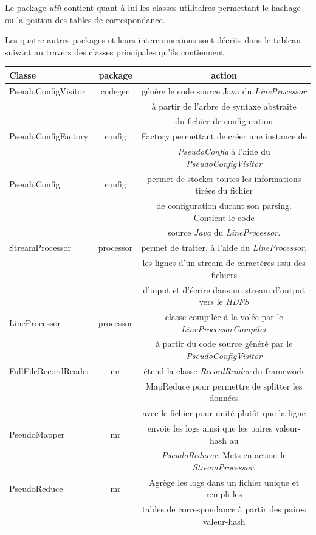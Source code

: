 \documentclass[12pt]{report}
\begin{document}
	Le package \textit{util} contient quant à lui les classes utilitaires permettant le hashage ou la gestion des tables de correspondance.
	
	Les quatre autres packages et leurs interconnexions sont décrits dans le tableau suivant au travers des classes principales qu'ils contiennent :\newline
	
	\begin{tabular}{|l|c|c|}
		\hline
		Classe & package & action \\
		\hline
		PseudoConfigVisitor & codegen & génère le code source Java du \textit{LineProcessor}\\
		&& à partir de l'arbre de syntaxe abstraite\\
		&&du fichier de configuration\\
		\hline
		PseudoConfigFactory&config&Factory permettant de créer une instance de \\
		&&\textit{PseudoConfig} à l'aide du \textit{PseudoConfigVisitor}\\
		\hline
		PseudoConfig&config&permet de stocker toutes les informations tirées du fichier\\
		&&de configuration durant son parsing. Contient le code  \\
		&&source \textit{Java} du \textit{LineProcessor}.\\
		\hline
		StreamProcessor & processor & permet de traiter, à l'aide du \textit{LineProcessor}, \\
		&&les lignes d'un stream de caractères issu des fichiers\\
		&& d'input et d'écrire dans un stream d'output vers le \textit{HDFS}\\
		\hline
		LineProcessor & processor & classe compilée à la volée par le  \textit{LineProcessorCompiler}\\
		&& à partir du code source généré par le \textit{PseudoConfigVisitor} \\
		\hline
		FullFileRecordReader & mr & étend la classe \textit{RecordReader} du framework\\
		&&MapReduce pour permettre de splitter les données\\
		&& avec le fichier pour unité plutôt que la ligne\\
		\hline
		PseudoMapper & mr &envoie les logs ainsi que les paires valeur-hash au \\
		&&\textit{PseudoReducer}. Mets en action le \textit{StreamProcessor}.\\
		
		\hline
		PseudoReduce & mr &Agrège les logs dans un fichier unique et rempli les\\
		&&tables de correspondance à partir des paires valeur-hash\\
		\hline
	\end{tabular}
	
\end{document}
